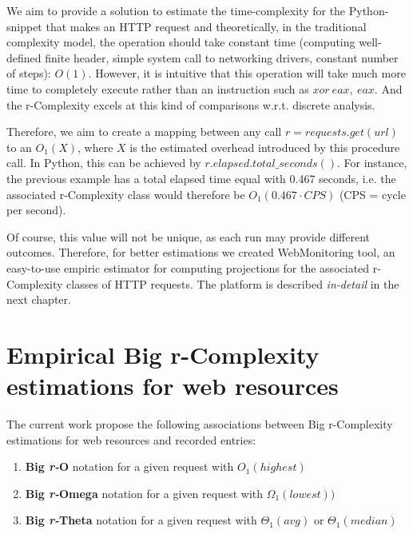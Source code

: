We aim to provide a solution to estimate the time-complexity for the Python-snippet that makes an HTTP request and theoretically, in the traditional complexity model, the operation should take constant time (computing well-defined finite header, simple system call to networking drivers, constant number of steps): $O(1)$. However, it is intuitive that this operation will take much more time to completely execute rather than an instruction such as $xor\ eax,\ eax$. And the r-Complexity excels at this kind of comparisons w.r.t. discrete analysis.

Therefore, we aim to create a mapping between any call $r = requests.get(url)$ to an $O_{1}(X)$, where $X$ is the estimated overhead introduced by this procedure call. In Python, this can be achieved by $r.elapsed.total\_seconds()$. For instance, the previous example has a total elapsed time equal with 0.467 seconds, i.e. the associated r-Complexity class would therefore be $O_{1}(0.467 \cdot CPS)$ (CPS = cycle per second). 

Of course, this value will not be unique, as each run may provide different outcomes. Therefore, for better estimations we created WebMonitoring tool, an easy-to-use empiric estimator for computing projections for the associated r-Complexity classes of HTTP requests. The platform is described \textit{in-detail} in the next chapter.


\section{Empirical Big r-Complexity estimations for web resources}


The current work propose the following associations between Big r-Complexity estimations for web resources and recorded entries: 

\begin{enumerate}
\item \textbf{Big \textit{r-}O} notation for a given request with $O_{1}(highest)$
\item \textbf{Big \textit{r-}Omega} notation for a given request with $\Omega_{1}(lowest))$
\item \textbf{Big \textit{r-}Theta} notation for a given request with $\Theta_{1}(avg)$ or $\Theta_{1}(median)$
\end{enumerate}

